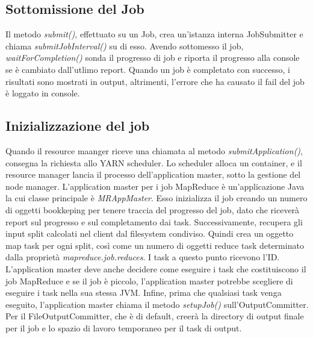 \subsection{Sottomissione del Job}
Il metodo \textit{submit()}, effettuato su un Job, crea un'istanza interna JobSubmitter e chiama \textit{submitJobInterval()} su di esso. Avendo sottomesso il job, \textit{waitForCompletion()} sonda il progresso di job e riporta il progresso alla console se è cambiato dall'utlimo report. Quando un job è completato con successo, i risultati sono mostrati in output, altrimenti, l'errore che ha causato il fail del job è loggato in console.
\subsection{Inizializzazione del job}
Quando il resource maanger riceve una chiamata al metodo \textit{submitApplication()}, consegna la richiesta allo YARN scheduler. Lo scheduler alloca un container, e il resource manager lancia il processo dell'application master, sotto la gestione del node manager. L'application master per i job MapReduce è un'applicazione Java la cui classe principale è \textit{MRAppMaster}. Esso inizializza il job creando un numero di oggetti bookkeping per tenere traccia del progresso del job, dato che riceverà report sul progresso e sul completamento dai task. Successivamente, recupera gli input split calcolati nel client dal filesystem condiviso. Quindi crea un oggetto map task per ogni split, così come un numero di oggetti reduce task determinato dalla proprietà \textit{mapreduce.job.reduces}. I task a questo punto ricevono l'ID. L'application master deve anche decidere come eseguire i task che costituiscono il job MapReduce e se il job è piccolo, l'application master potrebbe scegliere di eseguire i task nella sua stessa JVM. Infine, prima che qualsiasi task venga eseguito, l'application master chiama il metodo \textit{setupJob()} sull'OutputCommitter. Per il FileOutputCommitter, che è di default, creerà la directory di output finale per il job e lo spazio di lavoro temporaneo per il task di output.
